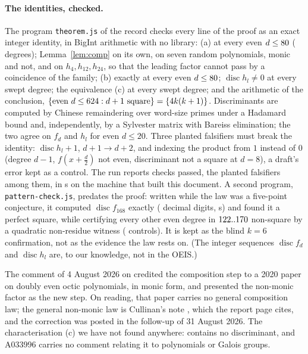 \documentclass[11pt]{article}
\DeclareMathOperator{\disc}{disc}
\begin{document}
\paragraph{The identities, checked.} The program \texttt{theorem.js} of the record \cite{Report} checks every line of the proof as an exact integer identity, in BigInt arithmetic with no library: (a) at every even $d\le80$ (\TheoremDegrees{} degrees); Lemma~\ref{lem:comp} on its own, on seven random polynomials, monic and not, and on $h_4,h_{12},h_{24}$, so that the leading factor cannot pass by a coincidence of the family; (b) exactly at every even $d\le80$; $\disc h_l\ne0$ at every swept degree; the equivalence (c) at every swept degree; and the arithmetic of the conclusion, $\{\text{even }d\le624:d+1\text{ square}\}=\{4k(k+1)\}$. Discriminants are computed by Chinese remaindering over word-size primes under a Hadamard bound and, independently, by a Sylvester matrix with Bareiss elimination; the two agree on $f_d$ and $h_l$ for even $d\le20$. Three planted falsifiers must break the identity: $\disc h_l+1$, $d+1\to d+2$, and indexing the product from $1$ instead of $0$ (degree $d-1$, $f(x+\frac d2)$ not even, discriminant not a square at $d=8$), a draft's error kept as a control. The run reports \TheoremChecks{} checks passed, the \TheoremFalsifiers{} planted falsifiers among them, in \TheoremSecs{} s on the machine that built this document. A second program, \texttt{pattern-check.js}, predates the proof: written while the law was a five-point conjecture, it computed $\disc f_{168}$ exactly (\PatternDigits{} decimal digits, \PatternSecs{} s) and found it a perfect square, while certifying every other even degree in $122..170$ non-square by a quadratic non-residue witness (\PatternControls{} controls). It is kept as the blind $k=6$ confirmation, not as the evidence the law rests on. (The integer sequences $\disc f_d$ and $\disc h_l$ are, to our knowledge, not in the OEIS.)



\begin{remark}
The comment of 4 August 2026 on \cite{Issue164} credited the composition step to a 2020 paper on doubly even octic polynomials, in monic form, and presented the non-monic factor as the new step. On reading, that paper carries no general composition law; the general non-monic law is Cullinan's note \cite{Cullinan}, which the report page cites, and the correction was posted in the follow-up of 31 August 2026. The characterisation (c) we have not found anywhere: \cite{vD24} contains no discriminant, and A033996 \cite{OEIS} carries no comment relating it to polynomials or Galois groups.
\end{remark}
\end{document}
